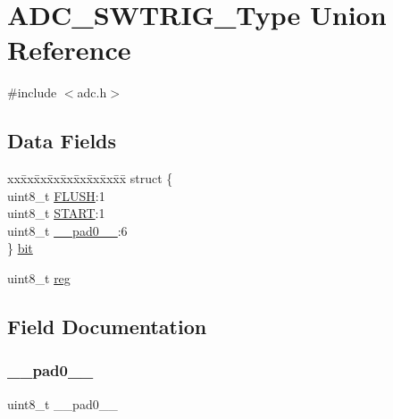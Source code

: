 \hypertarget{union_a_d_c___s_w_t_r_i_g___type}{}\section{A\+D\+C\+\_\+\+S\+W\+T\+R\+I\+G\+\_\+\+Type Union Reference}
\label{union_a_d_c___s_w_t_r_i_g___type}


{\ttfamily \#include $<$adc.\+h$>$}

\subsection*{Data Fields}
\begin{DoxyCompactItemize}
\item 
\begin{tabbing}
xx\=xx\=xx\=xx\=xx\=xx\=xx\=xx\=xx\=\kill
struct \{\\
\>uint8\_t \mbox{\hyperlink{union_a_d_c___s_w_t_r_i_g___type_a30d3dfffaf367adc608d208bdba93fb9}{FLUSH}}:1\\
\>uint8\_t \mbox{\hyperlink{union_a_d_c___s_w_t_r_i_g___type_acd48c87f8808fb311a0f7e2c6159bc59}{START}}:1\\
\>uint8\_t \mbox{\hyperlink{union_a_d_c___s_w_t_r_i_g___type_a8b4eebe79ded0459acec2f4950102ba3}{\_\_pad0\_\_}}:6\\
\} \mbox{\hyperlink{union_a_d_c___s_w_t_r_i_g___type_ae1f3c80a83e7c06c1f8551cbdbfed012}{bit}}\\

\end{tabbing}\item 
uint8\+\_\+t \mbox{\hyperlink{union_a_d_c___s_w_t_r_i_g___type_a9428adc9af4653a2050e2536b55dec8d}{reg}}
\end{DoxyCompactItemize}


\subsection{Field Documentation}
\mbox{\label{union_a_d_c___s_w_t_r_i_g___type_a8b4eebe79ded0459acec2f4950102ba3}} 
\subsubsection{\texorpdfstring{\_\_pad0\_\_}{\_\_pad0\_\_}}
{\footnotesize\ttfamily uint8\+\_\+t \+\_\+\+\_\+pad0\+\_\+\+\_\+}

